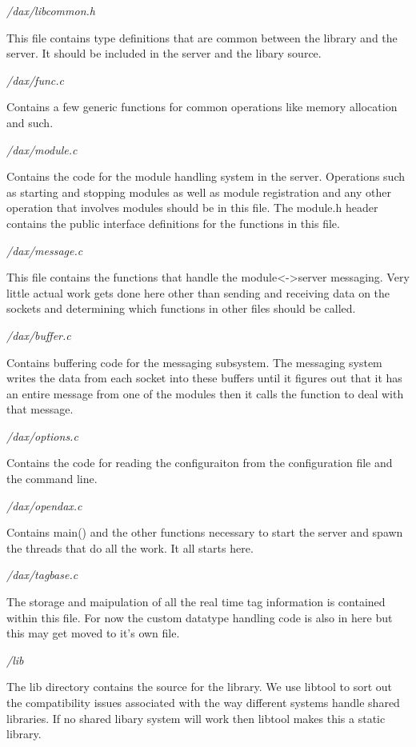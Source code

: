 \emph{/dax/libcommon.h}

This file contains type definitions that are common between the library and the server. It should be included in the server and the libary source.

\emph{/dax/func.c}

Contains a few generic functions for common operations like memory allocation and such.

\emph{/dax/module.c}

Contains the code for the module handling system in the server. Operations such as starting and stopping modules as well as module registration and any other operation that involves modules should be in this file. The module.h header contains the public interface definitions for the functions in this file.

\emph{/dax/message.c}

This file contains the functions that handle the module<->server messaging. Very little actual work gets done here other than sending and receiving data on the sockets and determining which functions in other files should be called.

\emph{/dax/buffer.c}

Contains buffering code for the messaging subsystem. The messaging system writes the data from each socket into these buffers until it figures out that it has an entire message from one of the modules then it calls the function to deal with that message.

\emph{/dax/options.c}

Contains the code for reading the configuraiton from the configuration file and the command line.

\emph{/dax/opendax.c}

Contains main() and the other functions necessary to start the server and spawn the threads that do all the work. It all starts here.

\emph{/dax/tagbase.c}

The storage and maipulation of all the real time tag information is contained within this file. For now the custom datatype handling code is also in here but this may get moved to it's own file.

\emph{/lib}

The lib directory contains the source for the library. We use libtool to sort out the compatibility issues associated with the way different systems handle shared libraries. If no shared libary system will work then libtool makes this a static library.

